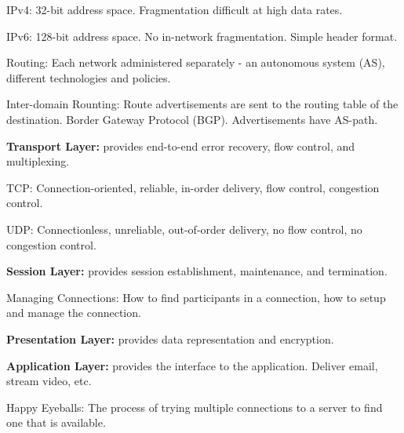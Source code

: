 \documentclass{article}
\begin{document}
\noindent IPv4: 32-bit address space. Fragmentation difficult at high data rates.

\noindent IPv6: 128-bit address space. No in-network fragmentation. Simple header format.

\noindent Routing: Each network administered separately - an autonomous system (AS), different technologies and policies.

\noindent Inter-domain Rounting: Route advertisements are sent to the routing table of the destination. Border Gateway Protocol (BGP). Advertisements have AS-path.


\noindent \textbf{Transport Layer:} provides end-to-end error recovery, flow control, and multiplexing.

\noindent TCP: Connection-oriented, reliable, in-order delivery, flow control, congestion control.

\noindent UDP: Connectionless, unreliable, out-of-order delivery, no flow control, no congestion control.


\noindent \textbf{Session Layer:} provides session establishment, maintenance, and termination.

\noindent Managing Connections: How to find participants in a connection, how to setup and manage the connection.

\noindent \textbf{Presentation Layer:} provides data representation and encryption.

\noindent \textbf{Application Layer:} provides the interface to the application. Deliver email, stream video, etc.

\noindent Happy Eyeballs: The process of trying multiple connections to a server to find one that is available.
\end{document}
